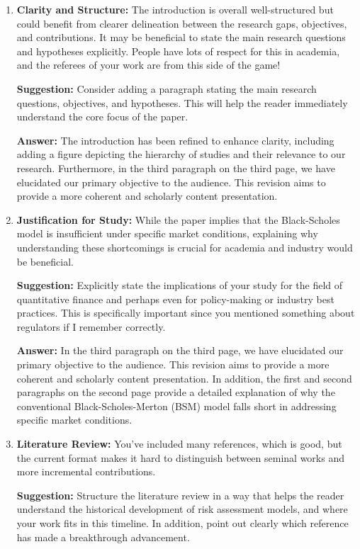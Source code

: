 \begin{enumerate}

\item \textbf{Clarity and Structure:}
The introduction is overall well-structured but could benefit from clearer delineation between the research gaps, objectives, and contributions. It may be beneficial to state the main research questions and hypotheses explicitly. People have lots of respect for this in academia, and the referees of your work are from this side of the game!

\textbf{Suggestion:}
Consider adding a paragraph stating the main research questions, objectives, and hypotheses. This will help the reader immediately understand the core focus of the paper.

\textbf{Answer:}
The introduction has been refined to enhance clarity, including adding a figure depicting the hierarchy of studies and their relevance to our research. Furthermore, in the third paragraph on the third page, we have elucidated our primary objective to the audience. This revision aims to provide a more coherent and scholarly content presentation.

\item \textbf{Justification for Study:}
While the paper implies that the Black-Scholes model is insufficient under specific market conditions, explaining why understanding these shortcomings is crucial for academia and industry would be beneficial.

\textbf{Suggestion:}
Explicitly state the implications of your study for the field of quantitative finance and perhaps even for policy-making or industry best practices. This is specifically important since you mentioned something about regulators if I remember correctly. 

\textbf{Answer:}
In the third paragraph on the third page, we have elucidated our primary objective to the audience. This revision aims to provide a more coherent and scholarly content presentation. In addition, the first and second paragraphs on the second page provide a detailed explanation of why the conventional Black-Scholes-Merton (BSM) model falls short in addressing specific market conditions.

\item \textbf{Literature Review:}
You've included many references, which is good, but the current format makes it hard to distinguish between seminal works and more incremental contributions.

\textbf{Suggestion:}
Structure the literature review in a way that helps the reader understand the historical development of risk assessment models, and where your work fits in this timeline. In addition, point out clearly which reference has made a breakthrough advancement. 


\end{enumerate}
